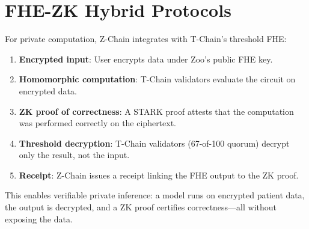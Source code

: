\section{FHE-ZK Hybrid Protocols}


For private computation, Z-Chain integrates with T-Chain's threshold FHE:

\begin{enumerate}
\item \textbf{Encrypted input}: User encrypts data under Zoo's public FHE key.
\item \textbf{Homomorphic computation}: T-Chain validators evaluate the circuit on encrypted data.
\item \textbf{ZK proof of correctness}: A STARK proof attests that the computation was performed correctly on the ciphertext.
\item \textbf{Threshold decryption}: T-Chain validators (67-of-100 quorum) decrypt only the result, not the input.
\item \textbf{Receipt}: Z-Chain issues a receipt linking the FHE output to the ZK proof.
\end{enumerate}

This enables verifiable private inference: a model runs on encrypted patient data, the output is decrypted, and a ZK proof certifies correctness---all without exposing the data.

